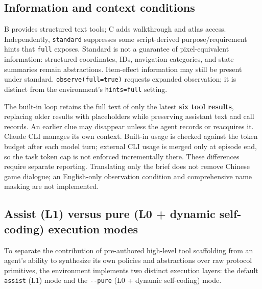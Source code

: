 \documentclass[11pt,a4paper]{article}
\begin{document}
\subsection{\texorpdfstring{Information and context conditions}{Information and context conditions}}

B provides structured text tools; C adds walkthrough and atlas access. Independently, \texttt{standard} suppresses some script-derived purpose/requirement hints that \texttt{full} exposes. Standard is not a guarantee of pixel-equivalent information: structured coordinates, IDs, navigation categories, and state summaries remain abstractions. Item-effect information may still be present under standard. \texttt{observe(\allowbreak{}full\allowbreak{}=\allowbreak{}true)} requests expanded observation; it is distinct from the environment's \texttt{hints\allowbreak{}=\allowbreak{}full} setting.

The built-in loop retains the full text of only the latest \textbf{six tool results}, replacing older results with placeholders while preserving assistant text and call records. An earlier clue may disappear unless the agent records or reacquires it. Claude CLI manages its own context. Built-in usage is checked against the token budget after each model turn; external CLI usage is merged only at episode end, so the task token cap is not enforced incrementally there. These differences require separate reporting. Translating only the brief does not remove Chinese game dialogue; an English-only observation condition and comprehensive name masking are not implemented.

\subsection{\texorpdfstring{Assist (L1) versus pure (L0 + dynamic self-coding) execution modes}{Assist (L1) versus pure (L0 + dynamic self-coding) execution modes}}

To separate the contribution of pre-authored high-level tool scaffolding from an agent's ability to synthesize its own policies and abstractions over raw protocol primitives, the environment implements two distinct execution layers: the default \texttt{assist} (L1) mode and the \texttt{-\allowbreak{}-\allowbreak{}pure} (L0 + dynamic self-coding) mode.
\end{document}
